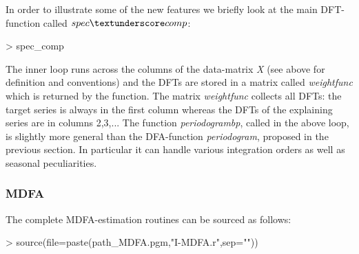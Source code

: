 \documentclass[a4paper]{book}
\begin{document}
In order to illustrate some of the new features we briefly look at the main DFT-function called $spec\textunderscore comp$:
\begin{Schunk}
\begin{Sinput}
> spec_comp
\end{Sinput}
\end{Schunk}
The inner loop runs across the columns of the data-matrix \emph{X} (see above for definition and conventions) and the DFTs are stored in a matrix called \emph{weight\textunderscore func} which is returned by the function. The matrix \emph{weight\textunderscore func} collects all DFTs: the target series is always in the first column whereas the DFTs of the explaining series are in columns 2,3,... The function \emph{periodogram\textunderscore bp}, called in the above loop, is slightly more general than the DFA-function \emph{periodogram}, proposed in the previous section. In particular it can handle various integration orders as well as seasonal peculiarities.  \\

\subsubsection{MDFA}

The complete MDFA-estimation routines can be sourced as follows:
\begin{Schunk}
\begin{Sinput}
> source(file=paste(path_MDFA.pgm,"I-MDFA.r",sep=""))
\end{Sinput}
\end{Schunk}
\end{document}
